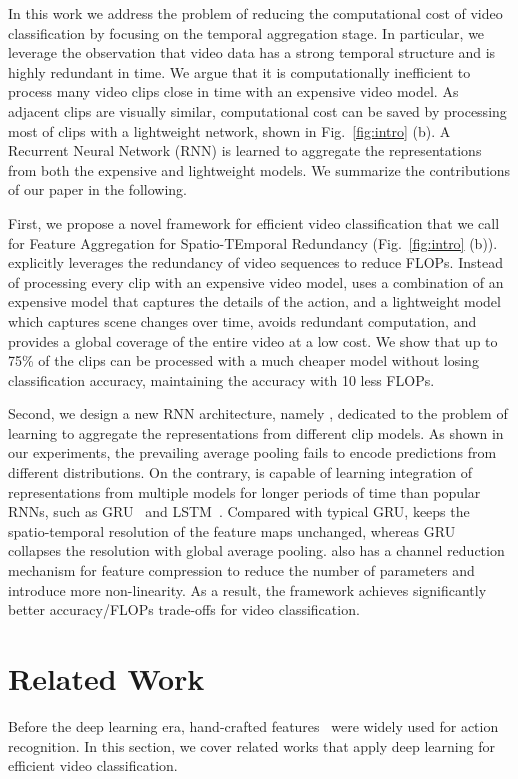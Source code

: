\documentclass[10pt,twocolumn,letterpaper]{article}
\begin{document}
In this work we address the problem of reducing the computational cost of video classification by focusing on the temporal aggregation stage. In particular, we leverage the observation that video data has a strong temporal structure and is highly redundant in time. We argue that it is computationally inefficient to process many video clips close in time with an expensive video model. 
As adjacent clips are visually similar, computational cost can be saved by processing most of clips with a lightweight network, shown in Fig.~\ref{fig:intro} (b). A Recurrent Neural Network (RNN) is learned to aggregate the representations from both the expensive and lightweight models. We summarize the contributions of our paper in the following.

First, we propose a novel framework for efficient video classification that we call {\em \oursfr} for Feature Aggregation for Spatio-TEmporal Redundancy (Fig.~\ref{fig:intro} (b)). \oursfr explicitly leverages the redundancy of video sequences to reduce FLOPs. Instead of processing every clip with an expensive video model, \oursfr uses a combination of an expensive model that captures the details of the action, and a lightweight model which captures scene changes over time, avoids redundant computation, and provides a global coverage of the entire video at a low cost.
We show that up to 75\% of the clips can be processed with a much cheaper model without losing classification accuracy, maintaining the \sota accuracy with 10 less FLOPs.


Second, we design a new RNN architecture, namely \ours, dedicated to the problem of learning to aggregate the representations from different clip models. As shown in our experiments, the prevailing average pooling fails to encode predictions from different distributions. On the contrary, \ours is capable of learning integration of representations from multiple models for longer periods of time than popular RNNs, such as GRU~\cite{Cho_GRU} and LSTM~\cite{lstm}. Compared with typical GRU, \ours  keeps the spatio-temporal resolution of the feature maps unchanged, whereas GRU collapses the resolution with global average pooling. \ours also has a channel reduction mechanism for feature compression to reduce the number of parameters and introduce more non-linearity. As a result, the \oursfr framework achieves significantly better accuracy/FLOPs trade-offs for video classification.  \section{Related Work}
\label{sec:related_work}
Before the deep learning era, hand-crafted features~\cite{wang2011action,wang2013action,laptev2005space,klaser2008spatio,dalal2006human} were widely used for action recognition. In this section, we cover related works that apply deep learning for efficient video classification.
\end{document}
